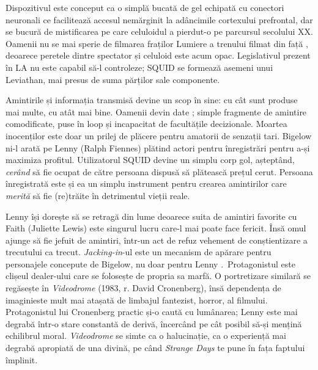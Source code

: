 \documentclass[12pt]{article}
\begin{document}
Dispozitivul este conceput ca o simplă bucată de gel echipată cu conectori neuronali ce facilitează accesul nemărginit la adâncimile cortexului prefrontal, dar se bucură de mistificarea pe care celuloidul a pierdut-o pe parcursul secolului XX. Oamenii nu se mai sperie de filmarea fraților Lumiere a trenului filmat din față \cite{Willistein1995a}, deoarece peretele dintre spectator și celuloid este acum opac. Legislativul prezent în LA nu este capabil să-l controleze; SQUID se formează asemeni unui Leviathan, mai presus de suma părților sale componente.\par

Amintirile și informația transmisă devine un scop în sine: cu cât sunt produse mai multe, cu atât mai bine. Oamenii devin date \cite{Vishnevetsky2012a}; simple fragmente de amintire comodificate, puse în loop și incapacitat de facultățile decizionale. Moartea inocenților este doar un prilej de plăcere pentru amatorii de senzații tari. Bigelow ni-l arată pe Lenny (Ralph Fiennes) plătind actori pentru înregistrări pentru a-și maximiza profitul. Utilizatorul SQUID devine un simplu corp gol, așteptând, \textit{cerând} să fie ocupat de către persoana dispusă să plătească prețul cerut. Persoana înregistrată este și ea un simplu instrument pentru crearea amintirilor care \textit{merită} să fie (re)trăite în detrimentul vieții reale.\par

Lenny își dorește să se retragă din lume deoarece suita de amintiri favorite cu Faith (Juliette Lewis) este singurul lucru care-l mai poate face fericit. Însă omul ajunge să fie jefuit de amintiri, într-un act de refuz vehement de conștientizare a trecutului ca trecut. \textit{Jacking-in}-ul este un mecanism de apărare pentru personajele concepute de Bigelow, nu doar pentru Lenny \cite{Palermo2020a}. Protagonistul este clișeul dealer-ului care se folosește de propria sa marfă. O portretizare similară se regăsește în \textit{Videodrome} (1983, r. David Cronenberg), însă \dedouble dependența de imagini\sqtworight este mult mai atașată de limbajul fantezist, horror, al filmului. Protagonistul lui Cronenberg practic și-o caută cu lumânarea; Lenny este mai degrabă într-o stare constantă de derivă, încercând pe cât posibil să-și mențină echilibrul moral. \textit{Videodrome} se simte ca o halucinație, ca o experiență mai degrabă apropiată de una divină, pe când \textit{Strange Days} te pune în fața faptului împlinit.\par
\end{document}
